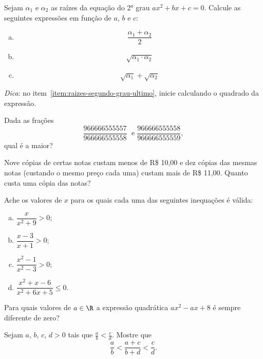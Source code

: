 \begin{exercise}
  Sejam $\alpha_1$ e $\alpha_2$ as raízes da equação do 2° grau $ax^2+bx+c=0$. Calcule
  as seguintes expressões em função de $a$, $b$ e $c$:
  \begin{enumerate}[a)]
    \item \[\frac{\alpha_1+\alpha_2}{2}\]
    \item \[\sqrt{\alpha_1\cdot\alpha_2}\]
    \item \label{item:raizes-segundo-grau-ultimo} \[\sqrt{\alpha_1}+\sqrt{\alpha_2}\]
  \end{enumerate}
  \textit{Dica}: no item~\ref{item:raizes-segundo-grau-ultimo}, inicie calculando o 
  quadrado da expressão.
\end{exercise}

\begin{exercise}
Dada as frações $$\frac{966666555557}{966666555558} \; \text{ e
} \; \frac{966666555558}{966666555559},$$ qual é a maior?
\end{exercise}


\begin{exercise}
Nove cópias de certas notas custam menos de R\$ 10,00 e dez
cópias das mesmas notas (custando o mesmo preço cada uma) custam
mais de R\$ 11,00. Quanto custa uma cópia das notas? 
\end{exercise}

\begin{exercise}
Ache os valores de $x$ para os quais cada uma das seguintes
inequações é válida:
\begin{enumerate}[a)]
  \item $\dfrac x {x^2+9} > 0$;
  \item $\dfrac{x-3}{x+1} > 0$;
  \item $\dfrac{x^2-1}{x^2-3} > 0$;
  \item $\dfrac{x^2+x-6}{x^2+6x+5} \leq 0$.
\end{enumerate}
\end{exercise}

\begin{exercise}
  Para quais valores de $ a \in \R$ a expressão quadrática $ax^2 -ax + 8$ é sempre diferente de zero?
  \end{exercise}

\begin{exercise}
Sejam  $a$, $b$, $c$, $d > 0$ tais que $\frac a b < \frac c d$.
Mostre que $$\frac a b < \frac {a+c} {b+d} < \frac c d.$$
\end{exercise}


